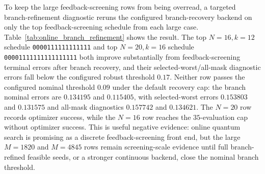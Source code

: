 \documentclass[preprint,12pt]{elsarticle}
\begin{document}
\begin{table}[t]
\centering
\caption{Paired online-threshold versus deployable classical finite-subspace baselines. Success columns are online/baseline global-optimum hits out of 200 paired seeds. Cost differences are online best cost minus baseline best cost with bootstrap 95\% intervals for the mean; negative favors online. Exact sign-test values use paired best-cost differences after excluding exact ties. The surrogate-ranked diagnostic ceiling is intentionally excluded.}
\label{tab:online_quantum_search_statistics}
\resizebox{\textwidth}{!}{}
\end{table}

To keep the large feedback-screening rows from being overread, a targeted branch-refinement diagnostic reruns the configured branch-recovery backend on only the top feedback-screening schedule from each large case. Table~\ref{tab:online_branch_refinement} shows the result. The top $N=16,k=12$ schedule \texttt{0000111111111111} and top $N=20,k=16$ schedule \texttt{00001111111111111111} both improve substantially from feedback-screening terminal errors after branch recovery, and their selected-worst/all-mask diagnostic errors fall below the configured robust threshold $0.17$. Neither row passes the configured nominal threshold $0.09$ under the default recovery cap: the branch nominal errors are $0.134195$ and $0.115405$, with selected-worst errors $0.153803$ and $0.131575$ and all-mask diagnostics $0.157742$ and $0.134621$. The $N=20$ row records optimizer success, while the $N=16$ row reaches the $35$-evaluation cap without optimizer success. This is useful negative evidence: online quantum search is promising as a discrete feedback-screening front end, but the large $M=1820$ and $M=4845$ rows remain screening-scale evidence until full branch-refined feasible seeds, or a stronger continuous backend, close the nominal branch threshold.

\begin{table}[t]
\centering
\caption{Targeted branch-refinement diagnostic for the top large feedback-screening schedules selected from the online-search subspace-cost artifacts. The default run refines one schedule per case with the configured branch-recovery cap and no multistart expansion. These rows are safeguards against overclaiming: selected and all-mask robust diagnostics fall below $0.17$, but both rows fail the $0.09$ nominal threshold.}
\label{tab:online_branch_refinement}
\resizebox{\textwidth}{!}{}
\end{table}
\end{document}
